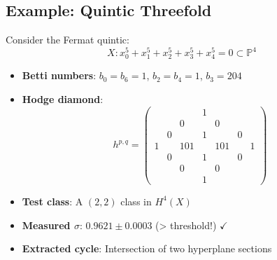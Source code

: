 \subsection{Example: Quintic Threefold}

Consider the Fermat quintic:
\begin{equation}
X: x_0^5 + x_1^5 + x_2^5 + x_3^5 + x_4^5 = 0 \subset \mathbb{P}^4
\end{equation}

\begin{itemize}
\item \textbf{Betti numbers}: $b_0 = b_6 = 1$, $b_2 = b_4 = 1$, $b_3 = 204$
\item \textbf{Hodge diamond}:
\begin{equation}
h^{p,q} = \begin{pmatrix}
 & & & 1 & & & \\
 & & 0 & & 0 & & \\
 & 0 & & 1 & & 0 & \\
1 & & 101 & & 101 & & 1 \\
 & 0 & & 1 & & 0 & \\
 & & 0 & & 0 & & \\
 & & & 1 & & &
\end{pmatrix}
\end{equation}
\item \textbf{Test class}: A $(2,2)$ class in $H^4(X)$
\item \textbf{Measured $\sigma$}: $0.9621 \pm 0.0003$ (> threshold!) $\checkmark$
\item \textbf{Extracted cycle}: Intersection of two hyperplane sections
\end{itemize}

